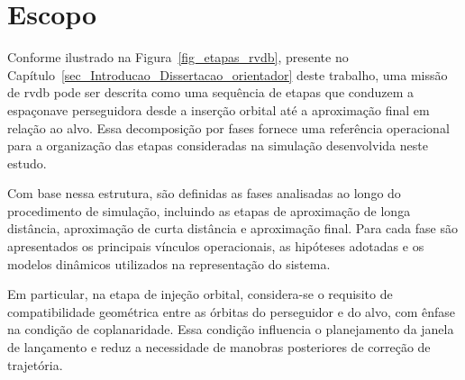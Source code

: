 \section{Escopo}
\label{sec_Escopo}


Conforme ilustrado na Figura~\ref{fig_etapas_rvdb}, presente no Capítulo~\ref{sec_Introducao_Dissertacao_orientador} deste trabalho, uma missão de \gls{rvdb} pode ser descrita como uma sequência de etapas que conduzem a espaçonave perseguidora desde a inserção orbital até a aproximação final em relação ao alvo. 
Essa decomposição por fases fornece uma referência operacional para a organização das etapas consideradas na simulação desenvolvida neste estudo.

Com base nessa estrutura, são definidas as fases analisadas ao longo do procedimento de simulação, incluindo as etapas de aproximação de longa distância, aproximação de curta distância e aproximação final. 
Para cada fase são apresentados os principais vínculos operacionais, as hipóteses adotadas e os modelos dinâmicos utilizados na representação do sistema.

Em particular, na etapa de injeção orbital, considera-se o requisito de compatibilidade geométrica entre as órbitas do perseguidor e do alvo, com ênfase na condição de coplanaridade. 
Essa condição influencia o planejamento da janela de lançamento e reduz a necessidade de manobras posteriores de correção de trajetória.
